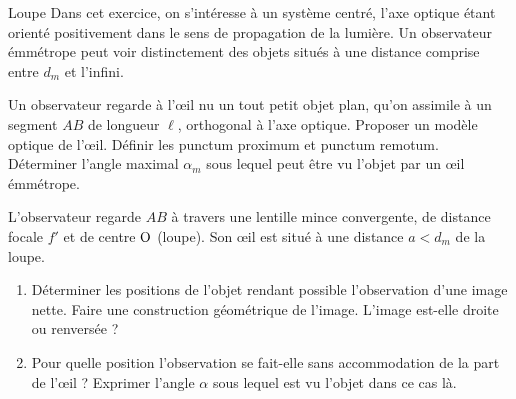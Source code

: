 \begin{exo}[PCSI]{Loupe}
Dans cet exercice, on s'intéresse à un système centré, l'axe optique étant orienté positivement dans le sens de propagation de la lumière. Un observateur émmétrope peut voir distinctement des objets situés à une distance comprise entre $d_m$ et l'infini.
\begin{quest}
\item Un observateur regarde à l'œil nu un tout petit objet plan, qu'on assimile à un segment $AB$ de longueur $\ell$, orthogonal à l'axe optique. Proposer un modèle optique de l'œil. Définir les punctum proximum et punctum remotum. Déterminer l'angle maximal $\alpha_m$ sous lequel peut être vu l'objet par un œil émmétrope.


\item L'observateur regarde $AB$ à travers une lentille mince convergente, de distance focale $f'$ et de centre $\rm O$ (loupe). Son œil est situé à une distance $a<d_m$ de la loupe.
\begin{enumerate}
\item Déterminer les positions de l'objet rendant possible l'observation d'une image nette. Faire une construction géométrique de l'image. L'image est-elle droite ou renversée ?
\item Pour quelle position l'observation se fait-elle sans accommodation de la part de l'œil ? Exprimer l'angle $\alpha$ sous lequel est vu l'objet dans ce cas là.


\end{enumerate}
\end{quest}
\end{exo}
